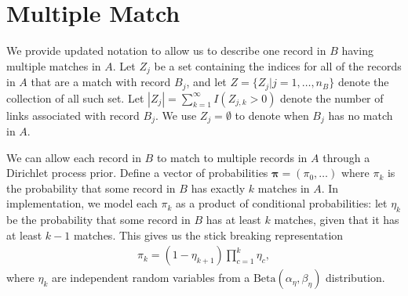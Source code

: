 \documentclass[12pt,letterpaper]{article}
\newcommand{\1}[1]{\mathbb{I}\!\left[#1\right]} %
\begin{document}
%
%

\section{Multiple Match}

We provide updated notation to allow us to describe one record in $B$ having multiple matches in $A$. Let $Z_j$ be a set containing the indices for all of the records in $A$ that are a match with record $B_j$, and let $Z = \{Z_j | j = 1, \ldots, n_B\}$ denote the collection of all such set. Let $|Z_j| = \sum_{k=1}^{\infty} I(Z_{j, k} > 0)$ denote the number of links associated with record $B_j$. We use $Z_j = \emptyset$ to denote when $B_j$ has no match in $A$.

We can allow each record in $B$ to match to multiple records in $A$ through a Dirichlet process prior. Define a vector of probabilities $\bm{\pi} = (\pi_0, \ldots)$ where $\pi_k$ is the probability that some record in $B$ has exactly $k$ matches in $A$. In implementation, we model each $\pi_k$ as a product of conditional probabilities: let $\eta_k$ be the probability that some record in $B$ has at least $k$ matches, given that it has at least $k-1$ matches. This gives us the stick breaking representation
\begin{align}
	\pi_k = (1 - \eta_{k+1}) \prod_{c=1}^{k} \eta_c, 
\end{align}
where $\eta_k$ are independent random variables from a $\text{Beta}(\alpha_{\eta}, \beta_{\eta})$ distribution.
\end{document}
